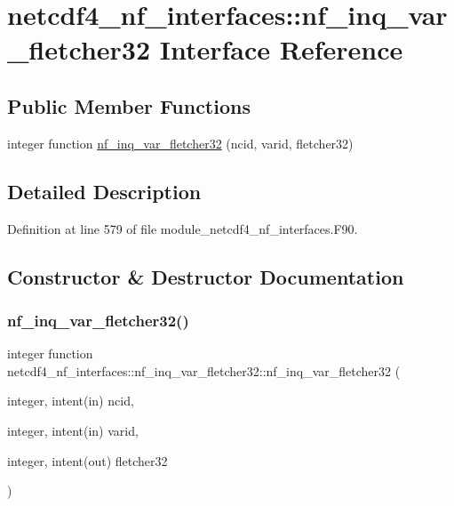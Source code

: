 \hypertarget{interfacenetcdf4__nf__interfaces_1_1nf__inq__var__fletcher32}{}\section{netcdf4\+\_\+nf\+\_\+interfaces\+:\+:nf\+\_\+inq\+\_\+var\+\_\+fletcher32 Interface Reference}
\label{interfacenetcdf4__nf__interfaces_1_1nf__inq__var__fletcher32}
\subsection*{Public Member Functions}
\begin{DoxyCompactItemize}
\item 
integer function \hyperlink{interfacenetcdf4__nf__interfaces_1_1nf__inq__var__fletcher32_a7a4569f0de3fe507141cc46e36826d81}{nf\+\_\+inq\+\_\+var\+\_\+fletcher32} (ncid, varid, fletcher32)
\end{DoxyCompactItemize}


\subsection{Detailed Description}


Definition at line 579 of file module\+\_\+netcdf4\+\_\+nf\+\_\+interfaces.\+F90.



\subsection{Constructor \& Destructor Documentation}
\mbox{\label{interfacenetcdf4__nf__interfaces_1_1nf__inq__var__fletcher32_a7a4569f0de3fe507141cc46e36826d81}} 
\subsubsection{\texorpdfstring{nf\+\_\+inq\+\_\+var\+\_\+fletcher32()}{nf\_inq\_var\_fletcher32()}}
{\footnotesize\ttfamily integer function netcdf4\+\_\+nf\+\_\+interfaces\+::nf\+\_\+inq\+\_\+var\+\_\+fletcher32\+::nf\+\_\+inq\+\_\+var\+\_\+fletcher32 (\begin{DoxyParamCaption}\item[{integer, intent(in)}]{ncid,  }\item[{integer, intent(in)}]{varid,  }\item[{integer, intent(out)}]{fletcher32 }\end{DoxyParamCaption})}




